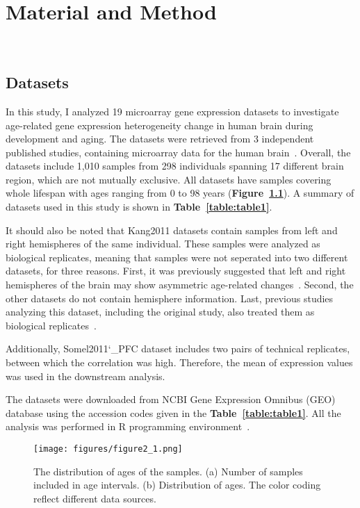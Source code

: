 \chapter{Material and Method}~\label{chp:b2}
\section{Datasets}
In this study, I analyzed 19 microarray gene expression datasets to investigate age-related gene expression heterogeneity change in human brain during development and aging.
The datasets were retrieved from 3 independent published studies, containing microarray data for the human brain~\cite{Colantuoni2011, Kang2011, Somel2011, Somel2010}.
Overall, the datasets include 1,010 samples from 298 individuals spanning 17 different brain region, which are not mutually exclusive.
All datasets have samples covering whole lifespan with ages ranging from 0 to 98 years (\textbf{Figure~\ref{fig:fig2.1}}).
A summary of datasets used in this study is shown in \textbf{Table~\ref{table:table1}}.

It should also be noted that Kang2011 datasets contain samples from left and right hemispheres of the same individual.
These samples were analyzed as biological replicates, meaning that samples were not seperated into two different datasets, for three reasons.
First, it was previously suggested that left and right hemispheres of the brain may show asymmetric age-related changes~\cite{Sun2005, Dolcos2002}.
Second, the other datasets do not contain hemisphere information.
Last, previous studies analyzing this dataset, including the original study, also treated them as biological replicates~\cite{Kang2011,Donertas2017}.

Additionally, Somel2011\char`_PFC dataset includes two pairs of technical replicates, between which the correlation was high. 
Therefore, the mean of expression values was used in the downstream analysis.

The datasets were downloaded from NCBI Gene Expression Omnibus (GEO) database using the accession codes given in the \textbf{Table~\ref{table:table1}}. 
All the analysis was performed in R programming environment~\cite{R2020}.

\begin{figure}[h]
\centering
\texttt{[image: figures/figure2\_1.png]}
\caption{The distribution of ages of the samples. (a) Number of samples included in age intervals. (b) Distribution of ages. The color coding reflect different data sources. }\label{fig:fig2.1}
\end{figure}

